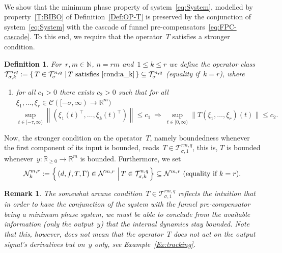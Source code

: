 \documentclass[ envcountsect, envcountsame]{svjour3}
\newtheorem{Definition}[Theorem]{Definition}
\newtheorem{Remark}[Theorem]{Remark}
\newcommand{\setdef}[2]{\left\{\, #1\, \left|\, \vphantom{#1} #2 \right.\right\}}
\newcommand{\R}{\mathbb{R}}
\newcommand{\N}{\mathbb{N}}
\newcommand{\cC}{\mathcal{C}}
\newcommand{\cN}{\mathcal{N}}
\newcommand{\cT}{\mathcal{T}}
\newcommand{\rp}{\mathbb{R}_{\geq 0}}
\begin{document}
\ \\
We show that the minimum phase property of system~\eqref{eq:System}, modelled by property~\ref{T:BIBO} of Definition~\ref{Def:OP-T} %
 is preserved by the 
conjunction of system~\eqref{eq:System} with the cascade of funnel pre-compensators~\eqref{eq:FPC-cascade}.
To this end, we require that the operator~$T$ satisfies a stronger condition.
%
\begin{Definition}
For~$r,m \in \N$, $n = rm$ and~$1\le k \le r$ we define the operator 
class~$\cT^{n,q}_{\sigma,k} := \setdef{ T \in \cT^{n,q}_\sigma}{ T~\text{satisfies~\ref{cond:a_k}}} \subseteq \cT^{n,q}_\sigma$ (equality if~$k=r$), where
\begin{enumerate}[label = ($\alph{enumi}'_k$), ref=($\alph{enumi}'_k$),leftmargin=*]
\item \label{cond:a_k}
for all $c_1 > 0$ there exists $c_2 > 0$ such that for all $\xi_1,\ldots,\xi_r \in \cC([-\sigma,\infty) \to\R^m)$  
\begin{equation*}
\sup_{t \in [-\tau,\infty)} \left\| \left(\xi_1(t)^\top,\ldots,\xi_{k}(t)^\top \right) \right\|  \le c_1 \ \Rightarrow \ \sup_{t \in [0,\infty)} \| T(\xi_1,\ldots,\xi_r)(t) \| \le c_2. 
\end{equation*}
\end{enumerate}
\end{Definition}
%
Now, the stronger condition on the operator~$T$, namely boundedness whenever the first component of its input is bounded, reads~$T \in \cT^{{rm},q}_{\sigma,1}$, this is, $T$ is bounded whenever~$y: \rp \to \R^{m}$ is bounded.
%
Furthermore, we set \[ \cN^{m,r}_k := \setdef{ (d,f,T,\Gamma) \in \cN^{m,r} }{ T \in \cT^{n,q}_{\sigma,k} } \subseteq \cN^{m,r} \text{ (equality if~$k=r$).} \]
%
\begin{Remark}
The somewhat arcane condition~$T \in \cT^{rm,q}_{\sigma,1}$ reflects the intuition that in order to have the conjunction of the system with the funnel pre-compensator being a minimum phase system, we must be able to conclude from the available information (only the output~$y$) that the internal dynamics stay bounded. 
Note that this, however, \textit{does not} mean that the operator~$T$ does not act on the output signal's derivatives but on~$y$ only, see Example~\ref{Ex:tracking}.
\end{Remark}
\end{document}

